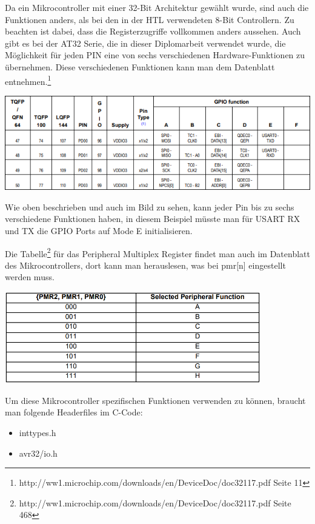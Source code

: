 \documentclass[paper=a4, 12pt]{scrreprt}
\begin{document}
	Da ein Mikrocontroller mit einer 32-Bit Architektur gewählt wurde, sind auch die Funktionen anders, als bei den in der HTL verwendeten 8-Bit Controllern. Zu beachten ist dabei, dass die Registerzugriffe vollkommen anders aussehen. Auch gibt es bei der AT32 Serie, die in dieser Diplomarbeit verwendet wurde, die Möglichkeit für jeden PIN eine von sechs verschiedenen Hardware-Funktionen zu übernehmen. Diese verschiedenen Funktionen kann man dem Datenblatt entnehmen.\footnote{http://ww1.microchip.com/downloads/en/DeviceDoc/doc32117.pdf Seite 11}
	\begin{adjustbox}{center,caption={Ausschnitt aus der Peripheral Multiplexing Tabelle},label={fig:PeripheralMultiplexRegisterTabelle.PNG},nofloat=figure,vspace=\bigskipamount}
		\includegraphics[width=\textwidth]{img/Peripheral_Multiplex_Register_Tabelle.PNG}
	\end{adjustbox}
	Wie oben beschrieben und auch im Bild zu sehen, kann jeder Pin bis zu sechs verschiedene Funktionen haben, in diesem Beispiel müsste man für USART RX und TX die GPIO Ports auf Mode E initialisieren.
	
	
	Die Tabelle\footnote{http://ww1.microchip.com/downloads/en/DeviceDoc/doc32117.pdf Seite 468} für das Peripheral Multiplex Register findet man auch im Datenblatt des Mikrocontrollers, dort kann man herauslesen, was bei pmr[n] eingestellt werden muss.
	\begin{adjustbox}{center,caption={Peripheral Multiplex Register Mode Tabelle},label={fig:PeripheralFunktions.PNG},nofloat=figure,vspace=\bigskipamount}
		\includegraphics[height=4cm]{img/Peripheral_Funktions.PNG}
	\end{adjustbox}
	\newpage
	Um diese Mikrocontroller spezifischen Funktionen verwenden zu können, braucht man folgende Headerfiles im C-Code:
	\begin{itemize}
		\item inttypes.h
		\item avr32/io.h
	\end{itemize}
\end{document}

